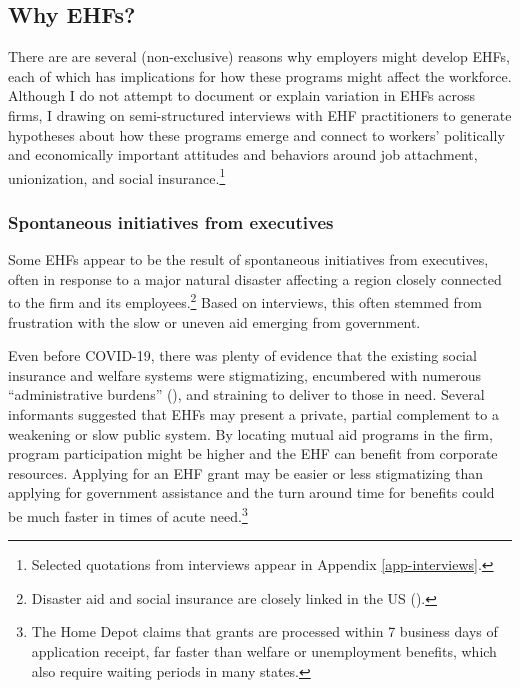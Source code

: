 \documentclass[
  11pt,
  oneside]{article}
\begin{document}
\subsection{Why EHFs?}\label{why-ehfs}

There are are several (non-exclusive) reasons why employers might develop EHFs, each of which has implications for how these programs might affect the workforce. Although I do not attempt to document or explain variation in EHFs across firms, I drawing on semi-structured interviews with EHF practitioners to generate hypotheses about how these programs emerge and connect to workers' politically and economically important attitudes and behaviors around job attachment, unionization, and social insurance.\footnote{Selected quotations from interviews appear in Appendix \ref{app-interviews}.}

\subsubsection{Spontaneous initiatives from executives}\label{spontaneous-initiatives-from-executives}

Some EHFs appear to be the result of spontaneous initiatives from executives, often in response to a major natural disaster affecting a region closely connected to the firm and its employees.\footnote{Disaster aid and social insurance are closely linked in the US ().} Based on interviews, this often stemmed from frustration with the slow or uneven aid emerging from government.

Even before COVID-19, there was plenty of evidence that the existing social insurance and welfare systems were stigmatizing, encumbered with numerous ``administrative burdens'' (), and straining to deliver to those in need. Several informants suggested that EHFs may present a private, partial complement to a weakening or slow public system. By locating mutual aid programs in the firm, program participation might be higher and the EHF can benefit from corporate resources. Applying for an EHF grant may be easier or less stigmatizing than applying for government assistance and the turn around time for benefits could be much faster in times of acute need.\footnote{The Home Depot claims that grants are processed within 7 business days of application receipt, far faster than welfare or unemployment benefits, which also require waiting periods in many states.}
\end{document}
